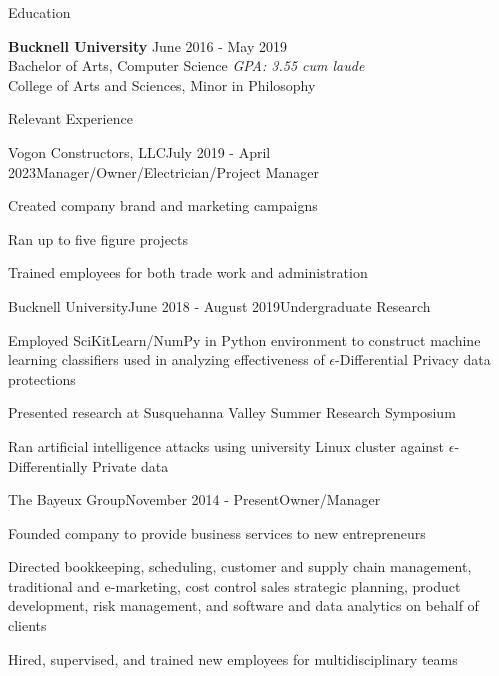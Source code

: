 \documentclass{resume} %
\begin{document}
\begin{rSection}{Education}

{\bf Bucknell University} {June 2016 - May 2019} 
\\ Bachelor of Arts, Computer Science  {\em GPA: 3.55 cum laude}
\\ College of Arts and Sciences, Minor in Philosophy 

\end{rSection}


\begin{rSection}{Relevant Experience}


\begin{rWorkSubsection}{Vogon Constructors, LLC}{July 2019 - April 2023}{Manager/Owner/Electrician/Project Manager}{}
\item Created company brand and marketing campaigns
\item Ran up to five figure projects
\item Trained employees for both trade work and administration
\end{rWorkSubsection}


\begin{rWorkSubsection}{Bucknell University}{June 2018 - August 2019}{Undergraduate Research}{}
\item Employed SciKitLearn/NumPy in Python environment to construct machine learning classifiers used in analyzing effectiveness of $\epsilon$-Differential Privacy data protections
\item Presented research at Susquehanna Valley Summer Research Symposium
\item Ran artificial intelligence attacks using university Linux cluster against $\epsilon$-Differentially Private data
\end{rWorkSubsection}


\begin{rWorkSubsection}{The Bayeux Group}{November 2014 - Present}{Owner/Manager}{}
\item Founded company to provide business services to new entrepreneurs
\item Directed bookkeeping, scheduling, customer and supply chain management, traditional and e-marketing, cost control sales strategic planning, product development, risk management, and software and data analytics on behalf of clients
\item Hired, supervised, and trained new employees for multidisciplinary teams
\end{rWorkSubsection}

\end{rSection}
\end{document}
